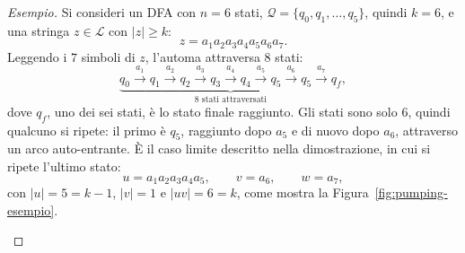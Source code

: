 \documentclass[a4paper, 11pt, oneside]{book}
\theoremstyle{formale}
\newenvironment{esempio}
    {\begin{proof}[\textit{Esempio}]\renewcommand{\qedsymbol}{$\diamond$}}
    {\end{proof}}
\begin{document}
    \begin{esempio}
        Si consideri un DFA con $n = 6$ stati, $\mathcal{Q} = \{q_0, q_1, \dots, q_5\}$,
        quindi $k = 6$, e una stringa $z \in \mathcal{L}$ con $|z| \geq k$:
        \begin{equation*}
            z = a_1 a_2 a_3 a_4 a_5 a_6 a_7.
        \end{equation*}
        Leggendo i $7$ simboli di $z$, l'automa attraversa $8$ stati:
        \begin{equation*}
            \underbrace{q_0 \xrightarrow{a_1} q_1 \xrightarrow{a_2} q_2
            \xrightarrow{a_3} q_3 \xrightarrow{a_4} q_4 \xrightarrow{a_5} q_5
            \xrightarrow{a_6} q_5 \xrightarrow{a_7} q_f}_{8 \text{ stati attraversati}},
        \end{equation*}
        dove $q_f$, uno dei sei stati, \`e lo stato finale raggiunto. Gli stati sono solo
        $6$, quindi qualcuno si ripete: il primo \`e $q_5$, raggiunto dopo $a_5$ e di
        nuovo dopo $a_6$, attraverso un arco auto-entrante. \`E il caso limite descritto nella
        dimostrazione, in cui si ripete l'ultimo stato:
        \begin{equation*}
            u = a_1 a_2 a_3 a_4 a_5,
            \qquad
            v = a_6,
            \qquad
            w = a_7,
        \end{equation*}
        con $|u| = 5 = k - 1$, $|v| = 1$ e $|uv| = 6 = k$, come mostra la
        Figura~\ref{fig:pumping-esempio}.

        \begin{figure}[H]
            \centering
\end{figure}
\end{esempio}
\end{document}
